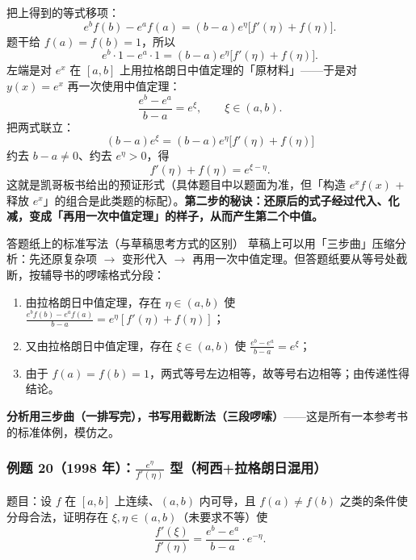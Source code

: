 \documentclass[a4paper]{article}
\begin{document}
把上得到的等式移项：
\[
e^{b}f(b)-e^{a}f(a)=(b-a)e^{\eta}\big[f'(\eta)+f(\eta)\big].
\]
题干给 $f(a)=f(b)=1$，所以
\[
e^{b}\cdot 1-e^{a}\cdot 1=(b-a)e^{\eta}\big[f'(\eta)+f(\eta)\big].
\]
左端是对 $e^x$ 在 $[a,b]$ 上用拉格朗日中值定理的「原材料」——于是对 $y(x)=e^x$ 再一次使用中值定理：
\[
\frac{e^{b}-e^{a}}{b-a}=e^{\xi},\qquad \xi\in(a,b).
\]
把两式联立：
\[
(b-a)e^{\xi}=(b-a)e^{\eta}\big[f'(\eta)+f(\eta)\big]
\]
约去 $b-a\neq0$、约去 $e^{\eta}>0$，得
\[
f'(\eta)+f(\eta)=e^{\xi-\eta}.
\]
这就是凯哥板书给出的预证形式（具体题目中以题面为准，但「构造 $e^xf(x)$ + 释放 $e^x$」的组合是此类题的标配）。\textbf{第二步的秘诀：还原后的式子经过代入、化减，变成「再用一次中值定理」的样子，从而产生第二个中值。}

\begin{knowledgebox}{答题纸上的标准写法（与草稿思考方式的区别）}
草稿上可以用「三步曲」压缩分析：先还原复杂项 $\rightarrow$ 变形代入 $\rightarrow$ 再用一次中值定理。但答题纸要从等号处截断，按辅导书的啰嗦格式分段：
\begin{enumerate}
\item 由拉格朗日中值定理，存在 $\eta\in(a,b)$ 使 $\frac{e^{b}f(b)-e^{a}f(a)}{b-a}=e^{\eta}[f'(\eta)+f(\eta)]$；
\item 又由拉格朗日中值定理，存在 $\xi\in(a,b)$ 使 $\frac{e^{b}-e^{a}}{b-a}=e^{\xi}$；
\item 由于 $f(a)=f(b)=1$，两式等号左边相等，故等号右边相等；由传递性得结论。
\end{enumerate}
\textbf{分析用三步曲（一排写完），书写用截断法（三段啰嗦）}——这是所有一本参考书的标准体例，模仿之。
\end{knowledgebox}

\subsubsection{例题 20（1998 年）：$\frac{e^\eta}{f'(\eta)}$ 型（柯西+拉格朗日混用）}

题目：设 $f$ 在 $[a,b]$ 上连续、$(a,b)$ 内可导，且 $f(a)\neq f(b)$ 之类的条件使分母合法，证明存在 $\xi,\eta\in(a,b)$（未要求不等）使
\[
\frac{f'(\xi)}{f'(\eta)}=\frac{e^{b}-e^{a}}{b-a}\cdot e^{-\eta} .
\]
\end{document}
